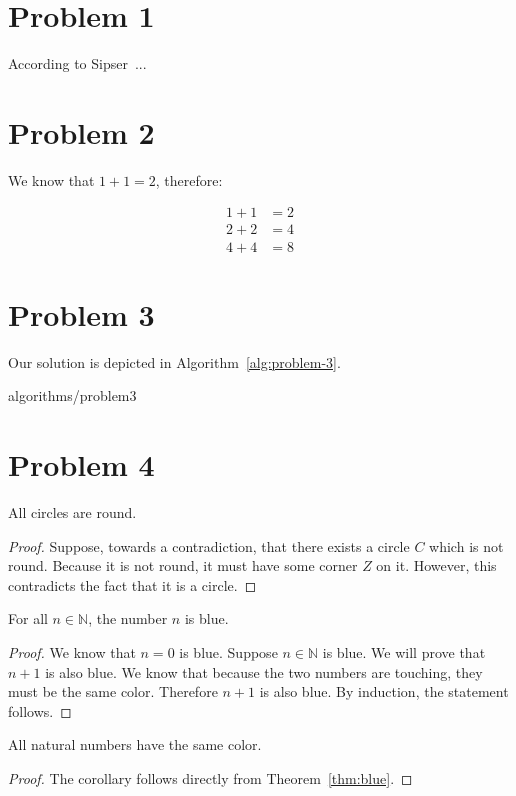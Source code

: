\section{Problem 1}
According to Sipser~\cite{sipser}...

\section{Problem 2}
We know that $1 + 1 = 2$, therefore:

\begin{align*}
  1 + 1 &= 2 \\
  2 + 2 &= 4 \\
  4 + 4 &= 8
\end{align*}

\section{Problem 3}

Our solution is depicted in Algorithm~\ref{alg:problem-3}.

{algorithms/problem3}

\section{Problem 4}

\begin{lemma}
  All circles are round.
\end{lemma}
\begin{proof}
  Suppose, towards a contradiction, that there exists a circle $C$
  which is not round. Because it is not round, it must have some
  corner $Z$ on it. However, this contradicts the fact that it is
  a circle.
  \Qed
\end{proof}

\begin{theorem}\label{thm:blue}
  For all $n \in \mathbb{N}$, the number $n$ is blue.
\end{theorem}
\begin{proof}
  We know that $n = 0$ is blue.
  Suppose $n \in \mathbb{N}$ is blue. We will prove
  that $n + 1$ is also blue. We know that because the two numbers are touching,
  they must be the same color. Therefore $n + 1$ is also blue.
  By induction, the statement follows.
  \Qed
\end{proof}

\begin{corollary}
  All natural numbers have the same color.
\end{corollary}
\begin{proof}
  The corollary follows directly from Theorem~\ref{thm:blue}.
  \Qed
\end{proof}


